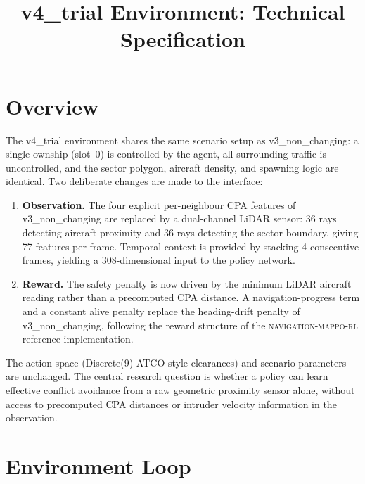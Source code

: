 \documentclass[11pt, a4paper]{article}
\title{\textbf{v4\_trial Environment: Technical Specification}}
\author{}
\date{}
\begin{document}
\maketitle

\section{Overview}

The v4\_trial environment shares the same scenario setup as v3\_non\_changing:
a single ownship (slot~0) is controlled by the agent, all surrounding traffic
is uncontrolled, and the sector polygon, aircraft density, and spawning logic
are identical.
Two deliberate changes are made to the interface:

\begin{enumerate}
    \item \textbf{Observation.} The four explicit per-neighbour CPA features of
          v3\_non\_changing are replaced by a dual-channel LiDAR sensor:
          36 rays detecting aircraft proximity and 36 rays detecting the sector
          boundary, giving 77 features per frame.
          Temporal context is provided by stacking 4 consecutive frames,
          yielding a 308-dimensional input to the policy network.
    \item \textbf{Reward.} The safety penalty is now driven by the minimum
          LiDAR aircraft reading rather than a precomputed CPA distance.
          A navigation-progress term and a constant alive penalty replace the
          heading-drift penalty of v3\_non\_changing, following the reward
          structure of the \textsc{navigation-mappo-rl} reference implementation.
\end{enumerate}

The action space (Discrete(9) ATCO-style clearances) and scenario parameters
are unchanged.
The central research question is whether a policy can learn effective conflict
avoidance from a raw geometric proximity sensor alone, without access to
precomputed CPA distances or intruder velocity information in the observation.

\section{Environment Loop}
\end{document}
